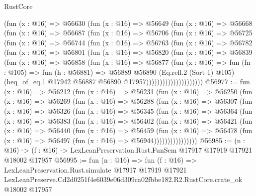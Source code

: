 \begin{lexlean}{RustCore}
\begin{coremodule}
              (fun (x : @16) =>
              @56630
                (fun (x : @16) =>
                @56649
                  (fun (x : @16) =>
                  @56668
                    (fun (x : @16) =>
                    @56687
                      (fun (x : @16) =>
                      @56706
                        (fun (x : @16) =>
                        @56725
                          (fun (x : @16) =>
                          @56744
                            (fun (x : @16) =>
                            @56763
                              (fun (x : @16) =>
                              @56782
                                (fun (x : @16) =>
                                @56801
                                  (fun (x : @16) =>
                                  @56820
                                    (fun (x : @16) =>
                                    @56839
                                      (fun (x : @16) =>
                                      @56858
                                        (fun (x : @16) =>
                                        @56877
                                          (fun (x : @16) =>
                                          fun (fn : @105) =>
                                          fun (h : @56881) =>
                                          @56889
                                            @56890
                                            (Eq.refl.{2} (Sort 1) @105)
                                            (heq_of_eq.{1}
                                              @17942
                                              @56887
                                              @56890
                                              @17957)))))))))))))))))))))
@56977 := fun (x : @16) =>
  @56212
    (fun (x : @16) =>
    @56231
      (fun (x : @16) =>
      @56250
        (fun (x : @16) =>
        @56269
          (fun (x : @16) =>
          @56288
            (fun (x : @16) =>
            @56307
              (fun (x : @16) =>
              @56326
                (fun (x : @16) =>
                @56345
                  (fun (x : @16) =>
                  @56364
                    (fun (x : @16) =>
                    @56383
                      (fun (x : @16) =>
                      @56402
                        (fun (x : @16) =>
                        @56421
                          (fun (x : @16) =>
                          @56440
                            (fun (x : @16) =>
                            @56459
                              (fun (x : @16) =>
                              @56478
                                (fun (x : @16) => @56497 (fun (x : @16) => @56944))))))))))))))))
@56985 := (n : @16) ->
  (f : @16) -> LexLeanPreservation.Rust.FunSem @17917 @17919 @17921 @18002 @17957
@56995 := fun (n : @16) =>
  fun (f : @16) =>
  LexLeanPreservation.Rust.simulate
    @17917
    @17919
    @17921
    LexLeanPreserve.Cd2d0251f4e6039e06d309ca02fbbe182.R2.RustCore.crate_ok
    @18002
    @17957
\end{coremodule}
\end{lexlean}
